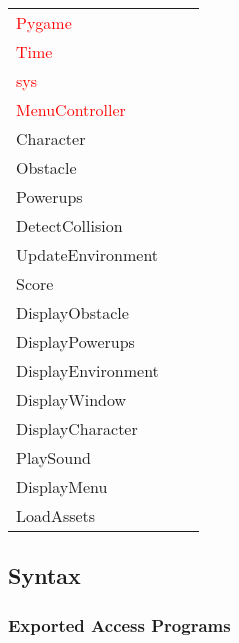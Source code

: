 \documentclass[12pt]{article}
\begin{document}
\begin{tabular}{lll}
\textcolor{red}{Pygame} & \\
\textcolor{red}{Time} & \\
\textcolor{red}{sys} & \\
\textcolor{red}{MenuController} & \\
    Character & \\
    Obstacle & \\
    Powerups & \\
    DetectCollision & \\
    UpdateEnvironment & \\
    Score & \\
    DisplayObstacle & \\
    DisplayPowerups & \\
    DisplayEnvironment & \\
    DisplayWindow & \\
    DisplayCharacter & \\
    PlaySound & \\
    DisplayMenu & \\
    LoadAssets 
\end{tabular}

\subsection* {Syntax}

\subsubsection* {Exported Access Programs}
\end{document}
